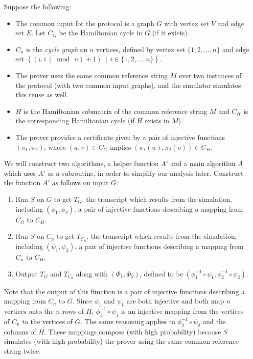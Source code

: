 \documentclass[draft]{article}
\renewcommand{\pmod}[1]{\,(\bmod{\,#1})}
\begin{document}
\begin{enumerate}
  Suppose the following:
  \begin{itemize}
  \item The common input for the protocol is a graph $G$ with vertex set $V$ and edge set $E$.
    Let $C_G$ be the Hamiltonian cycle in $G$ (if it exists).
  \item $C_n$ is the \emph{cycle graph} on $n$ vertices, defined by vertex set $\{1, 2, \ldots, n\}$ and edge set $\left\{(i, i \pmod{n} + 1)\,\middle|\, i\in \{1, 2, \ldots, n\}\right\}$.
  \item The prover uses the same common reference string $M$ over two instances of the protocol (with two common input graphs), and the simulator simulates this reuse as well.
  \item $H$ is the Hamiltonian submatrix of the common reference string $M$ and $C_H$ is the corresponding Hamiltonian cycle (if $H$ exists in $M$).
  \item The prover provides a certificate given by a pair of injective functions $(\pi_1, \pi_2)$, where $(u, v)\in C_G$ implies $(\pi_1(u), \pi_2(v))\in C_H$.
  \end{itemize}
  We will construct two algorithms, a helper function $A'$ and a main algorithm $A$ which uses $A'$ as a subroutine, in order to simplify our analysis later.
  Construct the function $A'$ as follows on input $G$:
  \begin{enumerate}
  \item Run $S$ on $G$ to get $T_G$, the transcript which results from the simulation, including $(\phi_1, \phi_2)$, a pair of injective functions describing a mapping from $C_G$ to $C_H$.
  \item Run $S$ on $C_n$ to get $T_{C_n}$, the transcript which results from the simulation, including $(\psi_1, \psi_2)$, a pair of injective functions describing a mapping from $C_n$ to $C_H$.
  \item Output $T_G$ and $T_{C_n}$ along with $(\Phi_1, \Phi_2)$, defined to be $(\phi_1^{-1}\circ\psi_1, \phi_2^{-1}\circ\psi_2)$.
  \end{enumerate}
  Note that the output of this function is a pair of injective functions describing a mapping from $C_n$ to $G$.
  Since $\phi_1$ and $\psi_1$ are both injective and both map $n$ vertices onto the $n$ rows of $H$, $\phi_1^{-1}\circ\psi_1$ is an injective mapping from the vertices of $C_n$ to the vertices of $G$.
  The same reasoning applies to $\phi_2^{-1}\circ\psi_2$ and the columns of $H$.
  These mappings compose (with high probability) because $S$ simulates (with high probability) the prover using the same common reference string twice.


\end{enumerate}
\end{document}
